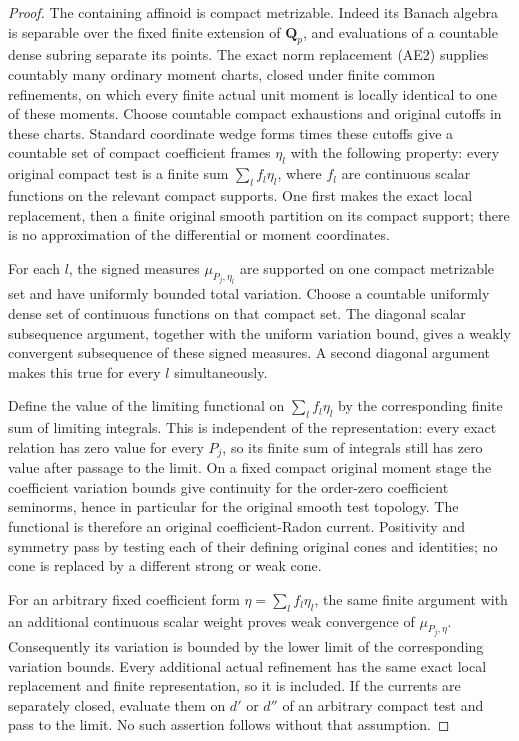 \documentclass[11pt,a4paper]{article}
\numberwithin{equation}{section}
\theoremstyle{definition}
\theoremstyle{remark}
\begin{document}
\begin{proof}
The containing affinoid is compact metrizable.  Indeed its Banach
algebra is separable over the fixed finite extension of $\mathbf Q_p$,
and evaluations of a countable dense subring separate its points.
The exact norm replacement (AE2) supplies countably many ordinary
moment charts, closed under finite common refinements, on which
every finite actual unit moment is locally identical to one of
these moments.  Choose countable compact exhaustions and original
cutoffs in these charts.  Standard coordinate wedge forms times
these cutoffs give a countable set of compact coefficient frames
$\eta_l$ with the following property: every original compact test
is a finite sum $\sum_l f_l\eta_l$, where $f_l$ are continuous
scalar functions on the relevant compact supports.  One first
makes the exact local replacement, then a finite original smooth
partition on its compact support; there is no approximation of
the differential or moment coordinates.

For each $l$, the signed measures $\mu_{P_j,\eta_l}$ are supported
on one compact metrizable set and have uniformly bounded total
variation.  Choose a countable uniformly dense set of continuous
functions on that compact set.  The diagonal scalar subsequence
argument, together with the uniform variation bound, gives a
weakly convergent subsequence of these signed measures.  A second
diagonal argument makes this true for every $l$ simultaneously.

Define the value of the limiting functional on
$\sum_l f_l\eta_l$ by the corresponding finite sum of limiting
integrals.  This is independent of the representation: every exact
relation has zero value for every $P_j$, so its finite sum of
integrals still has zero value after passage to the limit.  On a
fixed compact original moment stage the coefficient variation
bounds give continuity for the order-zero coefficient seminorms,
hence in particular for the original smooth test topology.
The functional is therefore an original coefficient-Radon current.
Positivity and symmetry pass by testing each of their defining
original cones and identities; no cone is replaced by a different
strong or weak cone.

For an arbitrary fixed coefficient form $\eta=\sum_l f_l\eta_l$,
the same finite argument with an additional continuous scalar
weight proves weak convergence of $\mu_{P_j,\eta}$.  Consequently
its variation is bounded by the lower limit of the corresponding
variation bounds.  Every additional actual refinement has the
same exact local replacement and finite representation, so it is
included.  If the currents are separately closed, evaluate them
on $d'$ or $d''$ of an arbitrary compact test and pass to the
limit.  No such assertion follows without that assumption.
\end{proof}
\end{document}
